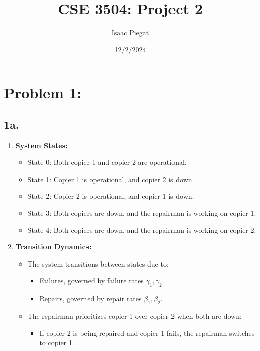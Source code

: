 \documentclass[12pt]{article}
\title{CSE 3504: Project 2}
\author{Isaac Piegat}
\date{12/2/2024}
\begin{document}
\maketitle

\section*{Problem 1:}

\subsection*{1a.}

\begin{enumerate}
    \item \textbf{System States:}
    \begin{itemize}
        \item State 0: Both copier 1 and copier 2 are operational.
        \item State 1: Copier 1 is operational, and copier 2 is down.
        \item State 2: Copier 2 is operational, and copier 1 is down.
        \item State 3: Both copiers are down, and the repairman is working on copier 1.
        \item State 4: Both copiers are down, and the repairman is working on copier 2.
    \end{itemize}

    \item \textbf{Transition Dynamics:}
    \begin{itemize}
        \item The system transitions between states due to:
        \begin{itemize}
            \item Failures, governed by failure rates $\gamma_1, \gamma_2$.
            \item Repairs, governed by repair rates $\beta_1, \beta_2$.
        \end{itemize}
        \item The repairman prioritizes copier 1 over copier 2 when both are down:
        \begin{itemize}
            \item If copier 2 is being repaired and copier 1 fails, the repairman switches to copier 1.
        \end{itemize}
    \end{itemize}


\end{enumerate}
\end{document}
